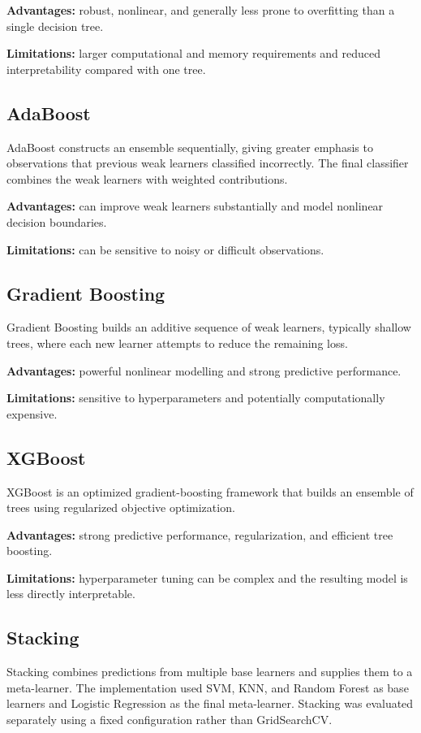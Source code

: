 \documentclass[12pt,a4paper]{article}
\begin{document}
\textbf{Advantages:} robust, nonlinear, and generally less prone to overfitting than a single decision tree.

\textbf{Limitations:} larger computational and memory requirements and reduced interpretability compared with one tree.

\subsection{AdaBoost}
AdaBoost constructs an ensemble sequentially, giving greater emphasis to observations that previous weak learners classified incorrectly. The final classifier combines the weak learners with weighted contributions.

\textbf{Advantages:} can improve weak learners substantially and model nonlinear decision boundaries.

\textbf{Limitations:} can be sensitive to noisy or difficult observations.

\subsection{Gradient Boosting}
Gradient Boosting builds an additive sequence of weak learners, typically shallow trees, where each new learner attempts to reduce the remaining loss.

\textbf{Advantages:} powerful nonlinear modelling and strong predictive performance.

\textbf{Limitations:} sensitive to hyperparameters and potentially computationally expensive.

\subsection{XGBoost}
XGBoost is an optimized gradient-boosting framework that builds an ensemble of trees using regularized objective optimization.

\textbf{Advantages:} strong predictive performance, regularization, and efficient tree boosting.

\textbf{Limitations:} hyperparameter tuning can be complex and the resulting model is less directly interpretable.

\subsection{Stacking}
Stacking combines predictions from multiple base learners and supplies them to a meta-learner. The implementation used SVM, KNN, and Random Forest as base learners and Logistic Regression as the final meta-learner. Stacking was evaluated separately using a fixed configuration rather than GridSearchCV.
\end{document}
